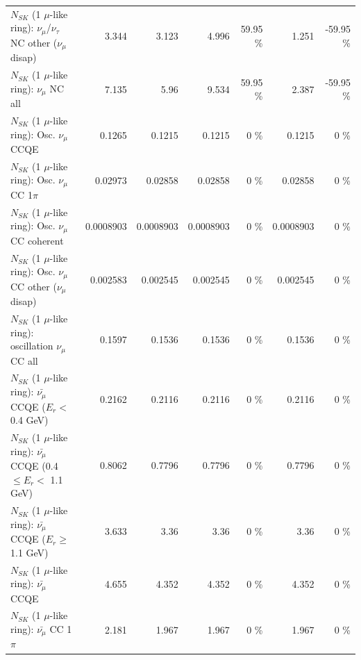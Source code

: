 \begin{table}
\begin{tabular}{| l | r | r | r  r | r  r |}
   $N_{SK}$ (1 $\mu$-like ring): $\nu_\mu$/$\nu_\tau$ NC other ($\nu_\mu$ disap) &           3.344 &           3.123 &           4.996 &    59.95 \%  &           1.251 &   -59.95 \%  \\ 
                                $N_{SK}$ (1 $\mu$-like ring): $\nu_{\mu}$ NC all &           7.135 &            5.96 &           9.534 &    59.95 \%  &           2.387 &   -59.95 \%  \\ 
\hline
\hline
                               $N_{SK}$ (1 $\mu$-like ring): Osc. $\nu_\mu$ CCQE &          0.1265 &          0.1215 &          0.1215 &        0 \%  &          0.1215 &        0 \%  \\ 
                          $N_{SK}$ (1 $\mu$-like ring): Osc. $\nu_\mu$ CC 1$\pi$ &         0.02973 &         0.02858 &         0.02858 &        0 \%  &         0.02858 &        0 \%  \\ 
                        $N_{SK}$ (1 $\mu$-like ring): Osc. $\nu_\mu$ CC coherent &       0.0008903 &       0.0008903 &       0.0008903 &        0 \%  &       0.0008903 &        0 \%  \\ 
         $N_{SK}$ (1 $\mu$-like ring): Osc. $\nu_\mu$ CC other ($\nu_\mu$ disap) &        0.002583 &        0.002545 &        0.002545 &        0 \%  &        0.002545 &        0 \%  \\ 
                      $N_{SK}$ (1 $\mu$-like ring): oscillation $\nu_\mu$ CC all &          0.1597 &          0.1536 &          0.1536 &        0 \%  &          0.1536 &        0 \%  \\ 
\hline
\hline
          $N_{SK}$ (1 $\mu$-like ring): $\bar{\nu_\mu}$ CCQE ($E_{r} <$ 0.4 GeV) &          0.2162 &          0.2116 &          0.2116 &        0 \%  &          0.2116 &        0 \%  \\ 
 $N_{SK}$ (1 $\mu$-like ring): $\bar{\nu_\mu}$ CCQE (0.4 $\leq E_{r} <$ 1.1 GeV) &          0.8062 &          0.7796 &          0.7796 &        0 \%  &          0.7796 &        0 \%  \\ 
       $N_{SK}$ (1 $\mu$-like ring): $\bar{\nu_\mu}$ CCQE ($E_{r} \geq$ 1.1 GeV) &           3.633 &            3.36 &            3.36 &        0 \%  &            3.36 &        0 \%  \\ 
\hline
                              $N_{SK}$ (1 $\mu$-like ring): $\bar{\nu_\mu}$ CCQE &           4.655 &           4.352 &           4.352 &        0 \%  &           4.352 &        0 \%  \\ 
                         $N_{SK}$ (1 $\mu$-like ring): $\bar{\nu_\mu}$ CC 1$\pi$ &           2.181 &           1.967 &           1.967 &        0 \%  &           1.967 &        0 \%  \\ 

\end{tabular}
\end{table}
